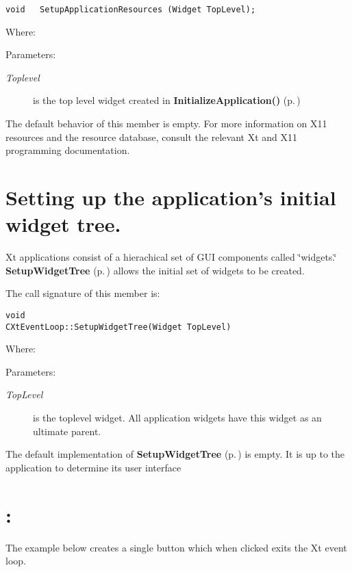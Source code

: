 \footnotesize\begin{verbatim}void   SetupApplicationResources (Widget TopLevel);
\end{verbatim}\normalsize 
 Where: \begin{Desc}
\item[Parameters: ]\par
\begin{description}
\item[{\em 
Toplevel}]is the top level widget created in  {\bf Initialize\-Application()} {\rm (p.\,\pageref{classCXtEventLoop_b6})}\end{description}
\end{Desc}
The default behavior of this member is empty. For more information on X11 resources and the resource database, consult the relevant Xt and X11  programming documentation.

\section{Setting up the application's initial widget tree.}\label{SetupWidgetTree}


Xt applications consist of a hierachical set of GUI components called  \char`\"{}widgets.\char`\"{} {\bf Setup\-Widget\-Tree} {\rm (p.\,\pageref{classCXtEventLoop_b8})} allows the initial set of widgets to be created.

The call signature of this member is: 

\footnotesize\begin{verbatim}void 
CXtEventLoop::SetupWidgetTree(Widget TopLevel)
\end{verbatim}\normalsize 


Where: \begin{Desc}
\item[Parameters: ]\par
\begin{description}
\item[{\em 
Top\-Level}]is the toplevel widget. All application widgets have this  widget as an ultimate parent.\end{description}
\end{Desc}
The default implementation of {\bf Setup\-Widget\-Tree} {\rm (p.\,\pageref{classCXtEventLoop_b8})} is empty. It is up to the application to determine its user interface

\section{:}\label{Example}
 The example below creates a single button which when clicked exits the Xt event loop.



